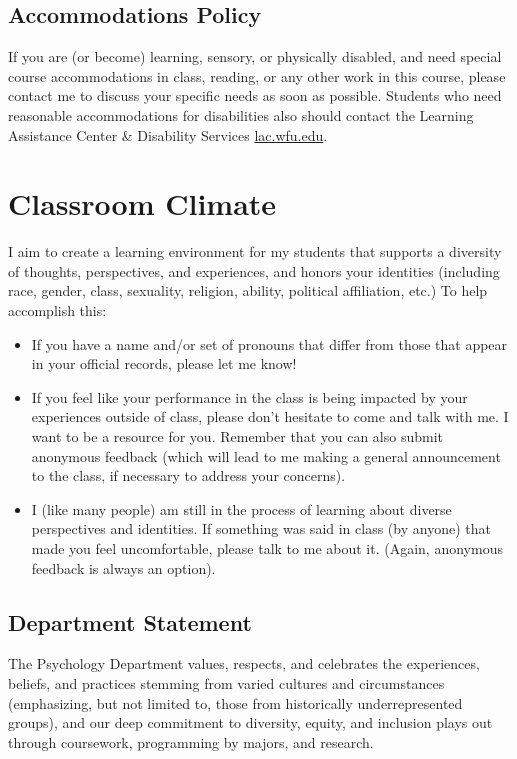 \documentclass[11pt,]{article}
\begin{document}
\subsection{Accommodations Policy}\label{accommodations-policy}

If you are (or become) learning, sensory, or physically disabled, and
need special course accommodations in class, reading, or any other work
in this course, please contact me to discuss your specific needs as soon
as possible. Students who need reasonable accommodations for
disabilities also should contact the Learning Assistance Center \&
Disability Services \href{https://lac.wfu.edu/}{lac.wfu.edu}.

\section{Classroom Climate}\label{classroom-climate}

I aim to create a learning environment for my students that supports a
diversity of thoughts, perspectives, and experiences, and honors your
identities (including race, gender, class, sexuality, religion, ability,
political affiliation, etc.) To help accomplish this:

\begin{itemize}
\item
  If you have a name and/or set of pronouns that differ from those that
  appear in your official records, please let me know!
\item
  If you feel like your performance in the class is being impacted by
  your experiences outside of class, please don't hesitate to come and
  talk with me. I want to be a resource for you. Remember that you can
  also submit anonymous feedback (which will lead to me making a general
  announcement to the class, if necessary to address your concerns).
\item
  I (like many people) am still in the process of learning about diverse
  perspectives and identities. If something was said in class (by
  anyone) that made you feel uncomfortable, please talk to me about it.
  (Again, anonymous feedback is always an option).
\end{itemize}

\subsection{Department Statement}\label{department-statement}

The Psychology Department values, respects, and celebrates the
experiences, beliefs, and practices stemming from varied cultures and
circumstances (emphasizing, but not limited to, those from historically
underrepresented groups), and our deep commitment to diversity, equity,
and inclusion plays out through coursework, programming by majors, and
research.
\end{document}
